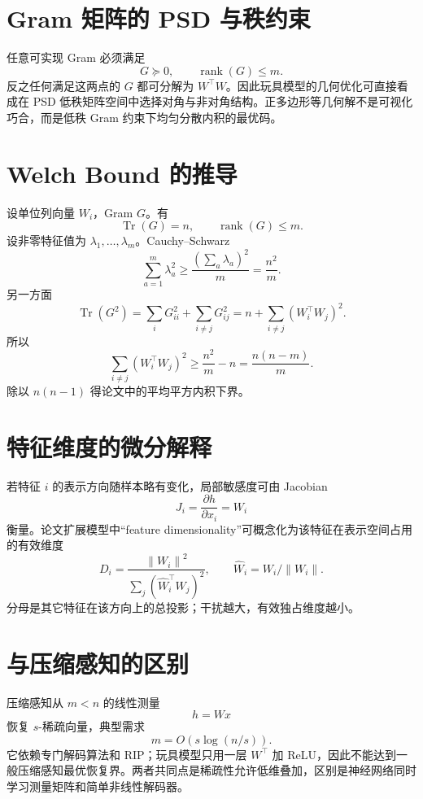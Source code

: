 \documentclass[UTF8,12pt,a4paper,fontset=none]{ctexart}
\numberwithin{equation}{section}
\newcommand{\norm}[1]{\left\lVert #1\right\rVert}
\newcommand{\tr}{\operatorname{Tr}}
\newcommand{\rank}{\operatorname{rank}}
\begin{document}
\section{Gram 矩阵的 PSD 与秩约束}
任意可实现 Gram 必须满足
\begin{equation}
 G\succeq0,
 \qquad \rank(G)\le m.
\end{equation}
反之任何满足这两点的 $G$ 都可分解为 $W^\top W$。因此玩具模型的几何优化可直接看成在 PSD 低秩矩阵空间中选择对角与非对角结构。正多边形等几何解不是可视化巧合，而是低秩 Gram 约束下均匀分散内积的最优码。

\section{Welch Bound 的推导}
设单位列向量 $W_i$，Gram $G$。有
\begin{equation}
 \tr(G)=n,
 \qquad \rank(G)\le m.
\end{equation}
设非零特征值为 $\lambda_1,\ldots,\lambda_m$。Cauchy--Schwarz
\begin{equation}
 \sum_{a=1}^{m}\lambda_a^2
 \ge\frac{(\sum_a\lambda_a)^2}{m}
 =\frac{n^2}{m}.
\end{equation}
另一方面
\begin{equation}
 \tr(G^2)=\sum_iG_{ii}^2+\sum_{i\ne j}G_{ij}^2
 =n+\sum_{i\ne j}(W_i^\top W_j)^2.
\end{equation}
所以
\begin{equation}
 \sum_{i\ne j}(W_i^\top W_j)^2
 \ge\frac{n^2}{m}-n
 =\frac{n(n-m)}m.
\end{equation}
除以 $n(n-1)$ 得论文中的平均平方内积下界。

\section{特征维度的微分解释}
若特征 $i$ 的表示方向随样本略有变化，局部敏感度可由 Jacobian
\begin{equation}
 J_i=\frac{\partial h}{\partial x_i}=W_i
\end{equation}
衡量。论文扩展模型中“feature dimensionality”可概念化为该特征在表示空间占用的有效维度
\begin{equation}
 D_i=\frac{\norm{W_i}^2}{\sum_j(\widehat W_i^\top W_j)^2},
 \qquad \widehat W_i=W_i/\norm{W_i}.
\end{equation}
分母是其它特征在该方向上的总投影；干扰越大，有效独占维度越小。

\section{与压缩感知的区别}
压缩感知从 $m<n$ 的线性测量
\begin{equation}
 h=Wx
\end{equation}
恢复 $s$-稀疏向量，典型需求
\begin{equation}
 m=O(s\log(n/s)).
\end{equation}
它依赖专门解码算法和 RIP；玩具模型只用一层 $W^\top$ 加 ReLU，因此不能达到一般压缩感知最优恢复界。两者共同点是稀疏性允许低维叠加，区别是神经网络同时学习测量矩阵和简单非线性解码器。
\end{document}
